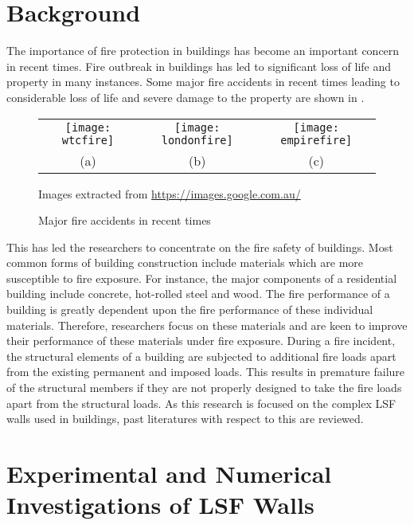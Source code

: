 \section{Background}
The importance of fire protection in buildings has become an important concern in recent times. Fire outbreak in buildings has led to significant loss of life and property in many instances. Some major fire accidents in recent times leading to considerable loss of life and severe damage to the property are shown in . 
\begin{figure}[htbp]
	\centering
		\begin{tabular}{ccc}
			\texttt{[image: wtcfire]} & 
			\texttt{[image: londonfire]} &
			\texttt{[image: empirefire]} \\ 
			(a) & (b) & (c) \\ 
		\end{tabular} 

	\begin{scriptsize}
	Images extracted from \url{https://images.google.com.au/}
	\end{scriptsize}
	
		\caption{Major fire accidents in recent times}
		\label{fig:Major fire accidents}
\end{figure}

This has led the researchers to concentrate on the fire safety of buildings. Most common forms of building construction include materials which are more susceptible to fire exposure. For instance, the major components of a residential building include concrete, hot-rolled steel and wood. The fire performance of a building is greatly dependent upon the fire performance of these individual materials. Therefore, researchers focus on these materials and are keen to improve their performance of these materials under fire exposure. During a fire incident, the structural elements of a building are subjected to additional fire loads apart from the existing permanent and imposed loads. This results in premature failure of the structural members if they are not properly designed to take the fire loads apart from the structural loads. As this research is focused on the complex LSF walls used in buildings, past literatures with respect to this are reviewed.

\section{Experimental and Numerical Investigations of LSF Walls}

